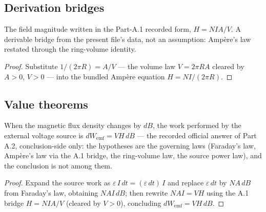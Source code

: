 \subsection*{Derivation bridges}

\begin{lemma}
\label{lem:IPhO2026Problems_problem_IPhO_2026_3_A_2:fieldStrength_eq_N_mul_I_mul_A_div_V}
\leanok
{}
The field magnitude written in the Part-A.1 recorded form,
$H = N I A / V$.  A derivable bridge from the present file's data, not an
assumption: Ampère's law restated through the ring-volume identity.
\end{lemma}
\begin{proof}
Substitute $1/(2\pi R) = A/V$ — the volume law $V = 2\pi R A$ cleared by
$A > 0$, $V > 0$ — into the bundled Ampère equation $H = N I/(2\pi R)$.
\end{proof}

\subsection*{Value theorems}

\begin{theorem}[A.2 target: source work $dW_{\mathrm{emf}} = V H\,dB$]
\label{thm:IPhO2026Problems_problem_IPhO_2026_3_A_2:work_emf_eq_V_mul_H_mul_dB}
\leanok
{}
When the magnetic flux density changes by $dB$, the work performed by the
external voltage source is $dW_{\mathrm{emf}} = V H\,dB$ — the recorded
official answer of Part A.2, conclusion-side only: the hypotheses are the
governing laws (Faraday's law, Ampère's law via the A.1 bridge, the
ring-volume law, the source power law), and the conclusion is not among them.
\end{theorem}
\begin{proof}
Expand the source work as $\varepsilon\,I\,dt = (\varepsilon\,dt)\,I$ and
replace $\varepsilon\,dt$ by $N A\,dB$ from Faraday's law, obtaining
$N A I\,dB$; then rewrite $N A I = V H$ using the A.1 bridge
$H = N I A / V$ (cleared by $V > 0$), concluding $dW_{\mathrm{emf}} = V H\,dB$.
\end{proof}
